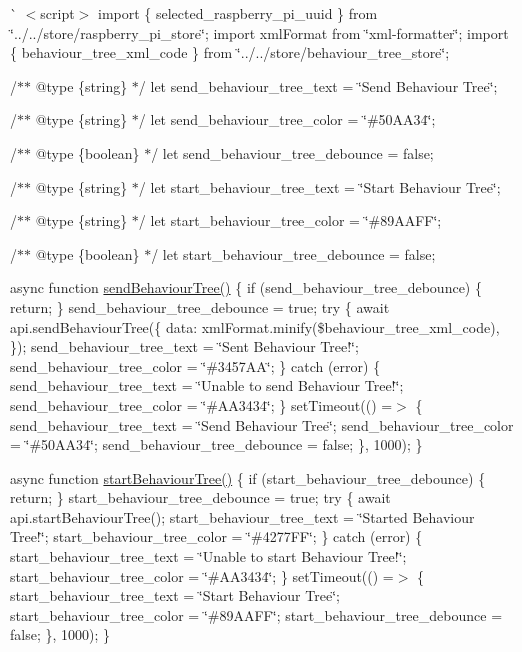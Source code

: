 \`{} $<$script$>$ import \{ selected\+\_\+raspberry\+\_\+pi\+\_\+uuid \} from \char`\"{}../../store/raspberry\+\_\+pi\+\_\+store\char`\"{}; import xml\+Format from \char`\"{}xml-\/formatter\char`\"{}; import \{ behaviour\+\_\+tree\+\_\+xml\+\_\+code \} from \char`\"{}../../store/behaviour\+\_\+tree\+\_\+store\char`\"{};

/$\ast$$\ast$ @type \{string\} $\ast$/ let send\+\_\+behaviour\+\_\+tree\+\_\+text = \char`\"{}\+Send Behaviour Tree\char`\"{};

/$\ast$$\ast$ @type \{string\} $\ast$/ let send\+\_\+behaviour\+\_\+tree\+\_\+color = \char`\"{}\#50\+AA34\char`\"{};

/$\ast$$\ast$ @type \{boolean\} $\ast$/ let send\+\_\+behaviour\+\_\+tree\+\_\+debounce = false;

/$\ast$$\ast$ @type \{string\} $\ast$/ let start\+\_\+behaviour\+\_\+tree\+\_\+text = \char`\"{}\+Start Behaviour Tree\char`\"{};

/$\ast$$\ast$ @type \{string\} $\ast$/ let start\+\_\+behaviour\+\_\+tree\+\_\+color = \char`\"{}\#89\+AAFF\char`\"{};

/$\ast$$\ast$ @type \{boolean\} $\ast$/ let start\+\_\+behaviour\+\_\+tree\+\_\+debounce = false;

async function \mbox{\hyperlink{behaviour__tree_8js_a0877b082bd308be13518093717c4bd45}{send\+Behaviour\+Tree()}} \{ if (send\+\_\+behaviour\+\_\+tree\+\_\+debounce) \{ return; \} send\+\_\+behaviour\+\_\+tree\+\_\+debounce = true; try \{ await api.\+send\+Behaviour\+Tree(\{ data\+: xml\+Format.\+minify(\$behaviour\+\_\+tree\+\_\+xml\+\_\+code), \}); send\+\_\+behaviour\+\_\+tree\+\_\+text = \char`\"{}\+Sent Behaviour Tree!\char`\"{}; send\+\_\+behaviour\+\_\+tree\+\_\+color = \char`\"{}\#3457\+AA\char`\"{}; \} catch (error) \{ send\+\_\+behaviour\+\_\+tree\+\_\+text = \char`\"{}\+Unable to send Behaviour Tree!\char`\"{}; send\+\_\+behaviour\+\_\+tree\+\_\+color = \char`\"{}\#\+AA3434\char`\"{}; \} set\+Timeout(() =\texorpdfstring{$>$}{>} \{ send\+\_\+behaviour\+\_\+tree\+\_\+text = \char`\"{}\+Send Behaviour Tree\char`\"{}; send\+\_\+behaviour\+\_\+tree\+\_\+color = \char`\"{}\#50\+AA34\char`\"{}; send\+\_\+behaviour\+\_\+tree\+\_\+debounce = false; \}, 1000); \}

async function \mbox{\hyperlink{behaviour__tree_8js_aac2c0c00fc0702be14d2e88e51016c2e}{start\+Behaviour\+Tree()}} \{ if (start\+\_\+behaviour\+\_\+tree\+\_\+debounce) \{ return; \} start\+\_\+behaviour\+\_\+tree\+\_\+debounce = true; try \{ await api.\+start\+Behaviour\+Tree(); start\+\_\+behaviour\+\_\+tree\+\_\+text = \char`\"{}\+Started Behaviour Tree!\char`\"{}; start\+\_\+behaviour\+\_\+tree\+\_\+color = \char`\"{}\#4277\+FF\char`\"{}; \} catch (error) \{ start\+\_\+behaviour\+\_\+tree\+\_\+text = \char`\"{}\+Unable to start Behaviour Tree!\char`\"{}; start\+\_\+behaviour\+\_\+tree\+\_\+color = \char`\"{}\#\+AA3434\char`\"{}; \} set\+Timeout(() =\texorpdfstring{$>$}{>} \{ start\+\_\+behaviour\+\_\+tree\+\_\+text = \char`\"{}\+Start Behaviour Tree\char`\"{}; start\+\_\+behaviour\+\_\+tree\+\_\+color = \char`\"{}\#89\+AAFF\char`\"{}; start\+\_\+behaviour\+\_\+tree\+\_\+debounce = false; \}, 1000); \}

